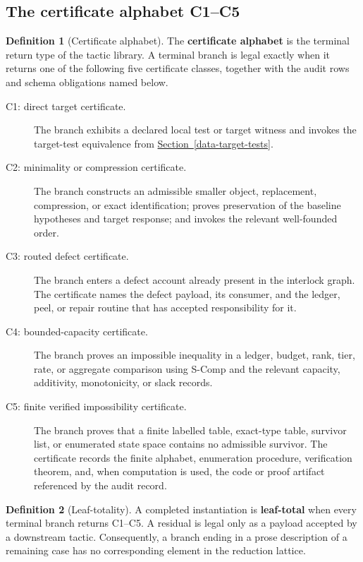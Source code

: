 \documentclass[
  11pt,
]{article}
\theoremstyle{definition}
\newtheorem{definition}{Definition}[section]
\newcommand{\secref}[1]{\hyperref[#1]{Section~\ref*{#1}}}
\begin{document}
\subsection{The certificate alphabet C1--C5}\label{data-certificate-alphabet}
\begin{definition}[Certificate alphabet]\label{def:certificate-alphabet}
The \textbf{certificate alphabet} is the terminal return type of the
tactic library.  A terminal branch is legal exactly when it returns one
of the following five certificate classes, together with the audit rows
and schema obligations named below.

\begin{description}
\item[C1: direct target certificate.]
The branch exhibits a declared local test or target witness and invokes
the target-test equivalence from \secref{data-target-tests}.

\item[C2: minimality or compression certificate.]
The branch constructs an admissible smaller object, replacement,
compression, or exact identification; proves preservation of the
baseline hypotheses and target response; and invokes the relevant
well-founded order.

\item[C3: routed defect certificate.]
The branch enters a defect account already present in the interlock
graph.  The certificate names the defect payload, its consumer, and the
ledger, peel, or repair routine that has accepted responsibility for it.

\item[C4: bounded-capacity certificate.]
The branch proves an impossible inequality in a ledger, budget, rank,
tier, rate, or aggregate comparison using S-Comp and the relevant
capacity, additivity, monotonicity, or slack records.

\item[C5: finite verified impossibility certificate.]
The branch proves that a finite labelled table, exact-type table,
survivor list, or enumerated state space contains no admissible
survivor.  The certificate records the finite alphabet, enumeration
procedure, verification theorem, and, when computation is used, the code
or proof artifact referenced by the audit record.
\end{description}
\end{definition}

\begin{definition}[Leaf-totality]\label{def:leaf-totality}
A completed instantiation is \textbf{leaf-total} when every terminal
branch returns C1--C5.  A residual is legal only as a payload accepted by
a downstream tactic.  Consequently, a branch ending in a prose
description of a remaining case has no corresponding element in the
reduction lattice.
\end{definition}
\end{document}

